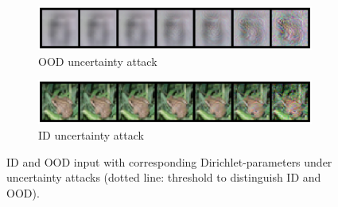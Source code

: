 \begin{figure}[ht!]
    \begin{subfigure}[t]{0.49 \columnwidth}
        \centering
        \includegraphics[width=0.99 \textwidth]{sections/008_icml2021/eval/ddnet_unc_ood_cifar10_images.png}
        \caption{OOD uncertainty attack
        }
        \label{fig:attaked_samples_idood_a}
    \end{subfigure}%
        \begin{subfigure}[t]{0.49 \columnwidth}
        \centering
        \includegraphics[width=0.99 \textwidth]{sections/008_icml2021/eval/ddnet_unc_id_cifar10_images.png}
        \caption{ID uncertainty attack
        }
        \label{fig:attaked_samples_idood_b}
    \end{subfigure}%
    \caption{ID and OOD input with corresponding Dirichlet-parameters under uncertainty attacks (dotted line: threshold to distinguish ID and OOD).}
    \label{fig:attaked_samples_idood}
\end{figure}





